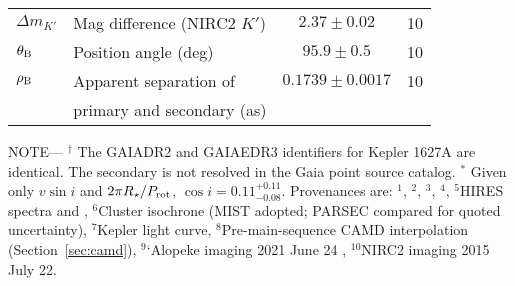 \begin{table*}
\begin{tabular}{llcc}
$\Delta m_{K'}$ & Mag difference (NIRC2 $K'$)\dotfill & $2.37 \pm 0.02$ & 10 \\
$\theta_{\rm B}$ & Position angle (deg)\dotfill & $95.9 \pm 0.5$ & 10 \\
$\rho_{\rm B}$ & Apparent separation of \dotfill & $0.1739 \pm 0.0017$ &  10 \\
                    & \hspace{3pt} primary and secondary (as) &  \\
%
\hline
\end{tabular}
\begin{flushleft}
 \footnotesize{ \textsc{NOTE}---
 $^\dagger$ The GAIADR2 and GAIAEDR3 identifiers for Kepler 1627A are identical.  The secondary
 is not resolved in the Gaia point source catalog.
 $^*$ Given only $v\sin i$ and $2\pi R_\star/P_{\rm rot}$, $\cos i=0.11^{+0.11}_{-0.08}$.
Provenances are:
$^1$\citet{gaia_collaboration_2021_edr3},
$^2$\citet{stassun_TIC8_2019},
$^3$\citet{skrutskie_tmass_2006},
$^4$\citet{Lindegren_2021_offset},
$^5$HIRES spectra and \citet{yee_SM_2017},
$^6$Cluster isochrone (MIST adopted; PARSEC compared for quoted
  uncertainty),
$^7$Kepler light curve,
$^8$Pre-main-sequence CAMD interpolation (Section~\ref{sec:camd}),
$^9$`Alopeke imaging 2021 June 24 \citep{scott_twin_2021},
$^{10}$NIRC2 imaging 2015 July 22.
}
\end{flushleft}
\vspace{-0.5cm}
\end{table*}

